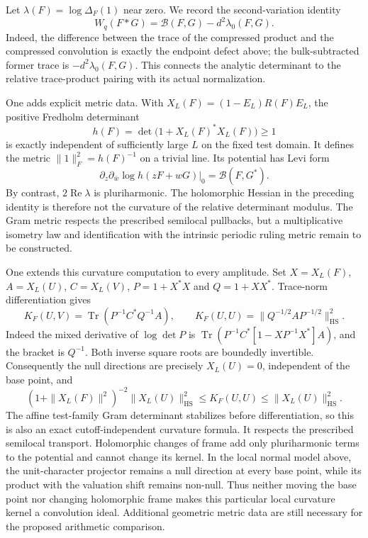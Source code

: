 \documentclass[11pt]{amsart}
\theoremstyle{definition}
\theoremstyle{remark}
\begin{document}
Let $\lambda(F)=\log\Delta_F(1)$ near zero. We record the
second-variation identity
\[
 W_q(F*G)=\mathcal B(F,G)-d^2\lambda_0(F,G).
\]
Indeed, the difference between the trace of the compressed product and
the compressed convolution is exactly the endpoint defect above;
the bulk-subtracted former trace is $-d^2\lambda_0(F,G)$.
This connects the analytic determinant to the relative trace-product
pairing with its actual normalization.

One adds explicit metric data. With
$X_L(F)=(1-E_L)R(F)E_L$, the positive Fredholm determinant
\[
 h(F)=\det\bigl(1+X_L(F)^*X_L(F)\bigr)\geq1
\]
is exactly independent of sufficiently large $L$ on the fixed test
domain. It defines the metric $\|1\|_F^2=h(F)^{-1}$ on a trivial line.
Its potential has Levi form
\[
 \left.\partial_z\partial_{\bar w}\log h(zF+wG)\right|_0
       =\mathcal B(F,G^*).
\]
By contrast, $2\operatorname{Re}\lambda$ is pluriharmonic. The
holomorphic Hessian in the preceding identity is therefore not the
curvature of the relative determinant modulus. The Gram metric
respects the prescribed semilocal pullbacks, but a multiplicative
isometry law and identification with the intrinsic periodic ruling
metric remain to be constructed.

One extends this curvature computation to every amplitude. Set
$X=X_L(F)$, $A=X_L(U)$, $C=X_L(V)$, $P=1+X^*X$ and
$Q=1+XX^*$. Trace-norm differentiation gives
\[
 K_F(U,V)=\operatorname{Tr}(P^{-1}C^*Q^{-1}A),\qquad
 K_F(U,U)=\|Q^{-1/2}AP^{-1/2}\|_{\mathrm{HS}}^2.
\]
Indeed the mixed derivative of $\log\det P$ is
$\operatorname{Tr}(P^{-1}C^*[1-XP^{-1}X^*]A)$, and the bracket
is $Q^{-1}$. Both inverse square roots are boundedly invertible.
Consequently the null directions are precisely $X_L(U)=0$,
independent of the base point, and
\[
 (1+\|X_L(F)\|^2)^{-2}\|X_L(U)\|_{\mathrm{HS}}^2
 \leq K_F(U,U)\leq\|X_L(U)\|_{\mathrm{HS}}^2.
\]
The affine test-family Gram determinant stabilizes before differentiation,
so this is also an exact cutoff-independent curvature formula. It
respects the prescribed semilocal transport. Holomorphic changes of
frame add only pluriharmonic terms to the potential and cannot change
its kernel. In the local normal model above, the unit-character
projector remains a null direction at every base point, while its
product with the valuation shift remains non-null. Thus neither moving
the base point nor changing holomorphic frame makes this particular
local curvature kernel a convolution ideal. Additional geometric metric
data are still necessary for the proposed arithmetic comparison.
\end{document}
